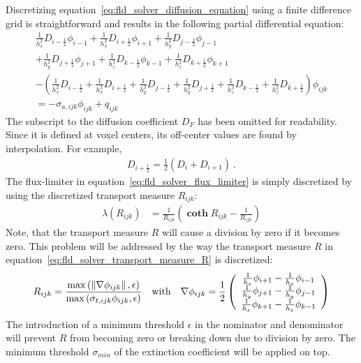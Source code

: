 Discretizing equation~\ref{eq:fld_solver_diffusion_equation} using a finite difference grid is straightforward and results in the following partial differential equation:
\begin{align}
\frac{1}{h_x^2}D_{i-\frac{1}{2}}\phi_{i-1}
+\frac{1}{h_x^2}D_{i+\frac{1}{2}}\phi_{i+1}
+\frac{1}{h_y^2}D_{j-\frac{1}{2}}\phi_{j-1}
\\
+\frac{1}{h_y^2}D_{j+\frac{1}{2}}\phi_{j+1}
+\frac{1}{h_z^2}D_{k-\frac{1}{2}}\phi_{k-1}
+\frac{1}{h_z^2}D_{k+\frac{1}{2}}\phi_{k+1}
\\
-\left(
\frac{1}{h_x^2}D_{i-\frac{1}{2}}+\frac{1}{h_x^2}D_{i+\frac{1}{2}}
+\frac{1}{h_y^2}D_{j-\frac{1}{2}}+\frac{1}{h_y^2}D_{j+\frac{1}{2}}
+\frac{1}{h_z^2}D_{k-\frac{1}{2}}+\frac{1}{h_z^2}D_{k+\frac{1}{2}}
\right)
\phi_{ijk}
\\
= -\sigma_{a, ijk}\phi_{ijk} + q_{ijk}
\label{eq:fld_solver_discretized_diffusion_equation}
\end{align}
The subscript to the diffusion coefficient $D_F$ has been omitted for readability. Since it is defined at voxel centers, its off-center values are found by interpolation. For example,
\begin{align}
D_{i+\frac{1}{2}} = \frac{1}{2}\left( D_{i}+D_{i+1}\right)\ .
\label{eq:fld_solver_D_interpolated}
\end{align}
The flux-limiter in equation~\ref{eq:fld_solver_flux_limiter} is simply discretized by using the discretized transport measure $R_{ijk}$:
\begin{align}
\lambda(R_{ijk}) &= \frac{1}{R_{ijk}}\left(\mathbf{\operatorname{coth}}R_{ijk} - \frac{1}{R_{ijk}}\right)
\label{eq:fld_solver_discrete_flux_limiter}
\end{align}
Note, that the transport measure $R$ will cause a division by zero if it becomes zero. This problem will be addressed by the way the transport measure $R$ in equation~\ref{eq:fld_solver_transport_measure_R} is discretized:
\begin{align}
R_{ijk} = \frac{\operatorname{max}\left(\left\lVert\nabla\phi_{ijk}\right\rVert,\epsilon\right)}{\operatorname{max}\left(\sigma_{t,ijk}\phi_{ijk},\epsilon\right)}
\quad
\text{with}
\quad
\nabla\phi_{ijk} = \frac{1}{2}
\left(
\begin{array}{c}
\frac{1}{h_x}\phi_{i+1}-\frac{1}{h_x}\phi_{i-1} \\
\frac{1}{h_y}\phi_{j+1}-\frac{1}{h_y}\phi_{j-1} \\
\frac{1}{h_z}\phi_{k+1}-\frac{1}{h_z}\phi_{k-1} \\
\end{array}
\right)
\label{eq:fld_solver_discrete_R}
\end{align}
The introduction of a minimum threshold $\epsilon$ in the nominator and denominator will prevent $R$ from becoming zero or breaking down due to division by zero. The minimum threshold $\sigma_{min}$ of the extinction coefficient will be applied on top.


